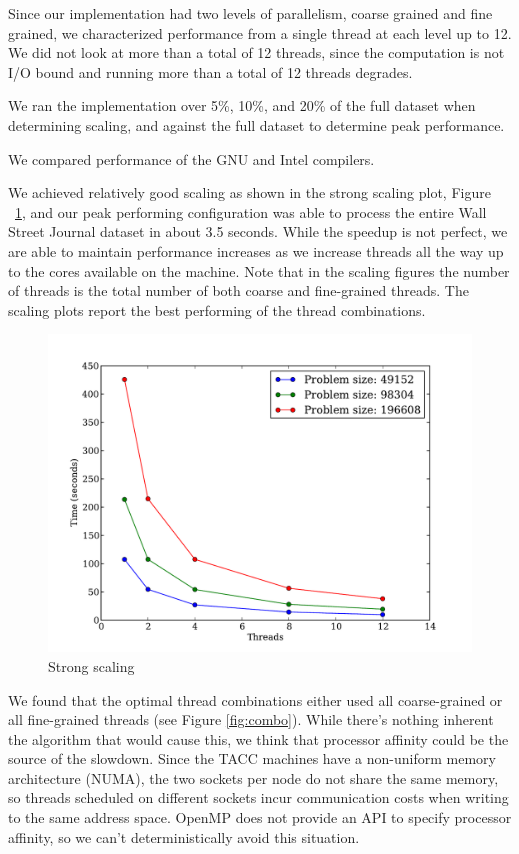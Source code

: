 \documentclass[11pt,onecolumn]{article}
\begin{document}

Since our implementation had two levels of parallelism, coarse grained and fine grained, we characterized performance from a single thread at each level up to 12. We did not look at more than a total of 12 threads, since the computation is not I/O bound and running more than a total of 12 threads degrades.

We ran the implementation over 5\%, 10\%, and 20\% of the full dataset when determining scaling, and against the full dataset to determine peak performance.

We compared performance of the GNU and Intel compilers.


We achieved relatively good scaling as shown in the strong scaling plot, Figure ~\ref{fig:strong_scaling}, and our peak performing configuration was able to process the entire Wall Street Journal dataset in about 3.5 seconds. While the speedup is not perfect, we are able to maintain performance increases as we increase threads all the way up to the cores available on the machine. Note that in the scaling figures the number of threads is the total number of both coarse and fine-grained threads. The scaling plots report the best performing of the thread combinations.

\begin{figure}[h!]
\centering
\includegraphics[width=.75\linewidth]{figures/intel_strong_scaling}
\caption{Strong scaling}
\label{fig:strong_scaling}
\end{figure}

We found that the optimal thread combinations either used all coarse-grained or all fine-grained threads (see Figure \ref{fig:combo}). While there's nothing inherent the algorithm that would cause this, we think that processor affinity could be the source of the slowdown. Since the TACC machines have a non-uniform memory architecture (NUMA), the two sockets per node do not share the same memory, so threads scheduled on different sockets incur communication costs when writing to the same address space. OpenMP does not provide an API to specify processor affinity, so we can't deterministically avoid this situation.
\end{document}
